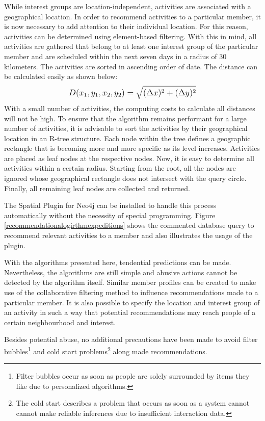 \documentclass[12pt,numbers=noenddot,parskip,bibliography=totocnumbered,listof=totocnumbered,draft]{scrreprt}
\begin{document}
While interest groups are location-independent, activities are associated with a geographical location. In order to recommend activities to a particular member, it is now necessary to add attention to their individual location. For this reason, activities can be determined using element-based filtering. With this in mind, all activities are gathered that belong to at least one interest group of the particular member and are scheduled within the next seven days in a radius of 30 kilometers. The activities are sorted in ascending order of date. The distance can be calculated easily as shown below:
\[
\mathlarger{D(x_1, y_1, x_2, y_2) = \sqrt{(\Delta x)^2+(\Delta y)^2}}
\]
With a small number of activities, the computing costs to calculate all distances will not be high. To ensure that the algorithm remains performant for a large number of activities, it is advisable to sort the activities by their geographical location in an R-tree structure. Each node within the tree defines a geographic rectangle that is becoming more and more specific as its level increases. Activities are placed as leaf nodes at the respective nodes. Now, it is easy to determine all activities within a certain radius. Starting from the root, all the nodes are ignored whose geographical rectangle does not intersect with the query circle. Finally, all remaining leaf nodes are collected and returned.

The Spatial Plugin \citep{spatial} for Neo4j can be installed to handle this process automatically without the necessity of special programming. Figure \ref{recommendationalogirthmexpeditions} shows the commented database query to recommend relevant activities to a member and also illustrates the usage of the plugin. 

With the algorithms presented here, tendential predictions can be made. Nevertheless, the algorithms are still simple and abusive actions cannot be detected by the algorithm itself. Similar member profiles can be created to make use of the collaborative filtering method to influence recommendations made to a particular member. It is also possible to specify the location and interest group of an activity in such a way that potential recommendations may reach people of a certain neighbourhood and interest.

Besides potential abuse, no additional precautions have been made to avoid filter bubbles\footnote{Filter bubbles occur as soon as people are solely surrounded by items they like due to personalized algorithms.} and cold start problems\footnote{The cold start describes a problem that occurs as soon as a system cannot cannot make reliable inferences due to insufficient interaction data.} along made recommendations.
\end{document}
